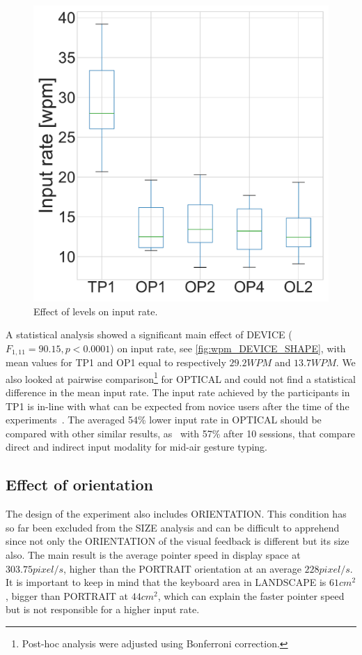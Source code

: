 \documentclass{chi-ext}
\newcommand{\cdt}[1]{{\small\uppercase{{#1}}}}
\begin{document}
{\begin{figure}
    \centering
    \includegraphics[width=\linewidth]{figures/wpm_DEVICE_SHAPE.pdf}
    \caption{Effect of levels on input rate.}
    \label{fig:wpm_DEVICE_SHAPE}
\end{figure}
}

A statistical analysis showed a significant main effect of \cdt{DEVICE} ($F_{1,11} = 90.15, p < 0.0001$) on input rate, see \autoref{fig:wpm_DEVICE_SHAPE}, with mean values for \cdt{TP1} and \cdt{OP1} equal to respectively $29.2 WPM$ and $13.7 WPM$. We also looked at pairwise comparison\footnote{Post-hoc analysis were adjusted using Bonferroni correction.} for \cdt{OPTICAL} and could not find a statistical difference in the mean input rate. The input rate achieved by the participants in \cdt{TP1} is in-line with what can be expected from novice users after the time of the experiments~\cite{Kristensson2004}. The averaged 54\% lower input rate in \cdt{OPTICAL} should be compared with other similar results, as~\cite{Markussen2014} with 57\% after 10 sessions, that compare direct and indirect input modality for mid-air gesture typing.

\subsection{Effect of orientation}
The design of the experiment also includes \cdt{ORIENTATION}. This condition has so far been excluded from the SIZE analysis and can be difficult to apprehend since not only the \cdt{ORIENTATION} of the visual feedback is different but its size also. The main result is the average pointer speed in display space at $303.75 pixel/s$, higher than the PORTRAIT orientation at an average $228 pixel/s$. It is important to keep in mind that the keyboard area in LANDSCAPE is $61cm^2$, bigger than PORTRAIT at $44cm^2$, which can explain the faster pointer speed but is not responsible for a higher input rate.
\end{document}
